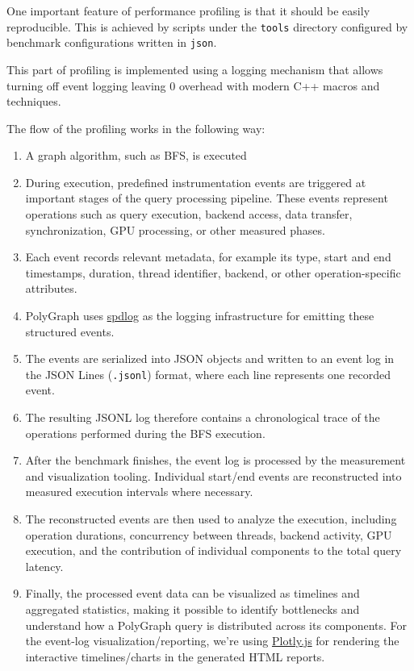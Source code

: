 \documentclass[11pt,a4paper]{article}
\begin{document}
One important feature of performance profiling is that it should be easily reproducible. This is achieved by scripts under the \texttt{tools} directory configured by benchmark configurations written in \texttt{json}. 

This part of profiling is implemented using a logging mechanism that allows turning off event logging leaving 0 overhead with modern C++ macros and techniques. 

The flow of the profiling works in the following way:

\begin{enumerate}
    \item A graph algorithm, such as BFS, is executed 

    \item During execution, predefined instrumentation events are triggered at
    important stages of the query processing pipeline. These events represent
    operations such as query execution, backend access, data transfer,
    synchronization, GPU processing, or other measured phases.

    \item Each event records relevant metadata, for example its type, start and
    end timestamps, duration, thread identifier, backend, or other
    operation-specific attributes.

    \item PolyGraph uses \href{https://github.com/gabime/spdlog}{spdlog} as the logging infrastructure for
    emitting these structured events.

    \item The events are serialized into JSON objects and written to an event
    log in the JSON Lines (\texttt{.jsonl}) format, where each line represents
    one recorded event.

    \item The resulting JSONL log therefore contains a chronological trace of
    the operations performed during the BFS execution.

    \item After the benchmark finishes, the event log is processed by the
    measurement and visualization tooling. Individual start/end events are
    reconstructed into measured execution intervals where necessary.

    \item The reconstructed events are then used to analyze the execution,
    including operation durations, concurrency between threads, backend
    activity, GPU execution, and the contribution of individual components to
    the total query latency.

    \item Finally, the processed event data can be visualized as timelines and
    aggregated statistics, making it possible to identify bottlenecks and
    understand how a PolyGraph query is distributed across its components.
    For the  event-log visualization/reporting, we're using \href{https://plotly.com/javascript/}{Plotly.js} for rendering 
    the interactive timelines/charts in the generated HTML reports.
\end{enumerate}
\end{document}
